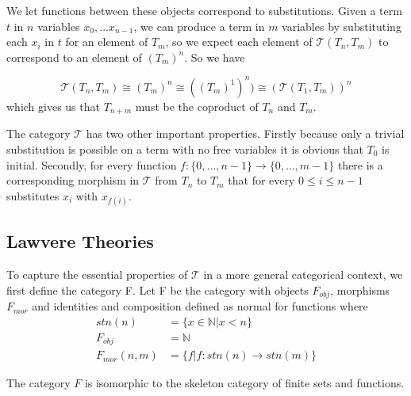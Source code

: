 We let functions between these objects correspond to substitutions. Given a term
$t$ in $n$ variables $x_0,\ldots x_{n-1}$, we can produce a term in $m$
variables by substituting each $x_i$ in $t$ for an element of $T_m$, so we
expect each element of $\mathcal{T}(T_n, T_m)$ to correspond to an element of
$(T_m)^n$. So we have

\[
\mathcal{T}(T_n, T_m)\cong
(T_m)^n\cong
((T_m)^1)^n)\cong
(\mathcal{T}(T_1, T_m))^n
\]
which gives us that $T_{n+m}$ must be the coproduct of $T_n$ and
$T_m$.

The category $\mathcal{T}$ has two other important properties. Firstly because
only a trivial substitution is possible on a term with no free variables it is
obvious that $T_0$ is initial. Secondly, for every function $f: \{0,\ldots,
n-1\} \rightarrow \{0,\ldots, m-1\}$ there is a corresponding morphism in
$\mathcal{T}$ from $T_n$ to $T_m$ that for every $0\leq i\leq n-1$ substitutes
$x_i$ with $x_{f(i)}$.

\subsection{Lawvere Theories} \label{gen_LT}
To capture the essential properties of $\mathcal{T}$ in a more general
categorical context, we first define the category F. Let F be the category with
objects $F_{obj}$, morphisms $F_{mor}$ and identities and composition defined as
normal for functions where
\begin{align*}
    stn(n) &= \{x\in \mathbb{N} | x < n\} \\
    F_{obj} &= \mathbb{N} \\
    F_{mor}(n, m) &= \{f | f: stn(n)\to stn(m)\}
\end{align*}

The category $F$ is isomorphic to the skeleton category of finite sets and
functions.

